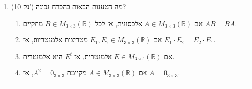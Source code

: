 \documentclass[12pt, a4paper]{article}
\newcommand{\rr}{\mathbb{R}}
\newcommand{\points}[1]{(#1 נק') }
\begin{document}
\begin{enumerate}
\item\points{10}
מה הטענות הבאות בהכרח נכונה?
\begin{enumerate}
\item
אם
$A\in M_{3\times 3}(\rr)$
אלכסונית, אז לכל
$B\in M_{3\times 3}(\rr)$
מתקיים
$AB=BA$.
\item
אם
$E_1,E_2\in M_{3\times 3}(\rr)$
מטריצות אלמנטריות, אז
$E_1\cdot E_2= E_2\cdot E_1$.

\item
אם 
$E\in M_{3\times3}(\rr)$
אלמנטרית,
אז
$E^t$
היא אלמנטרית.
\item
אם
$A\in M_{3\times 3}(\rr)$
מקיימת
$A^2=0_{3\times 3}$,
אז
$A=0_{3\times 3}$.
\end{enumerate}



\noindent\rule{16cm}{0.4pt}


\end{enumerate}
\end{document}
